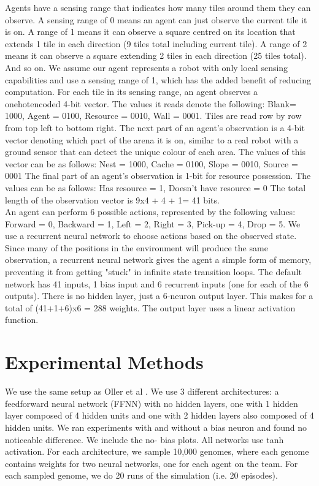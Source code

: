 \documentclass[12pt]{article}
\begin{document}
Agents have a sensing range that indicates how many tiles around them they can observe. 
A sensing range of 0 means an agent can just observe the current tile it is on. 
A range of 1 means it can observe a square centred  on its location that extends 1 tile in each direction (9 tiles total including current tile). 
A range of 2 means it can observe a square extending 2 tiles in each direction (25 tiles total). 
And so on.
We assume our agent represents a robot with only local sensing capabilities and use a sensing range of 1, which has the added benefit of reducing computation.
For each tile in its sensing range, an agent observes a onehotencoded 4-bit vector. 
The values it reads denote the following: Blank= 1000, Agent = 0100, Resource = 0010, Wall = 0001.
Tiles are read row by row from top left to bottom right. 
The next part of an agent's observation is a 4-bit vector denoting which part of the arena it is on, similar to a real robot with a ground sensor that can detect the unique colour of each area.
The values of this vector can be as follows: Nest = 1000, Cache = 0100, Slope = 0010, Source = 0001
The final part of an agent's observation is 1-bit for resource possession. 
The values can be as follows: Has resource = 1, Doesn’t have resource = 0
The total length of the observation vector is 9x4 + 4 + 1= 41 bits.\\

An agent can perform 6 possible actions, represented by the following values: Forward = 0, Backward = 1, Left = 2, Right = 3, Pick-up = 4, Drop = 5.
We use a recurrent neural network to choose actions based on the observed state.
Since many of the positions in the environment will produce the same observation, a recurrent neural network gives the agent a simple form of memory, preventing it from getting "stuck" in infinite state transition loops.
The default network has 41 inputs, 1 bias input and 6 recurrent inputs (one for each of the 6 outputs). 
There is no hidden layer, just a 6-neuron output layer. 
This makes for a total of (41+1+6)x6 = 288 weights. 
The output layer uses a linear activation function.

\section{Experimental Methods}

We use the same setup as Oller et al \cite{ferrante:PLOS_CB:2015}.
We use 3 different architectures: a feedforward neural network (FFNN) with no hidden layers, one with 1 hidden layer composed of 4 hidden units and one with 2 hidden layers also composed of 4 hidden units.
We ran experiments with and without a bias neuron and found no noticeable difference. We include the no- bias plots.
All networks use tanh activation.
For each architecture, we sample 10,000 genomes, where each genome contains weights for two neural networks, one for each agent on the team.
For each sampled genome, we do 20 runs of the simulation (i.e. 20 episodes). 
\end{document}
